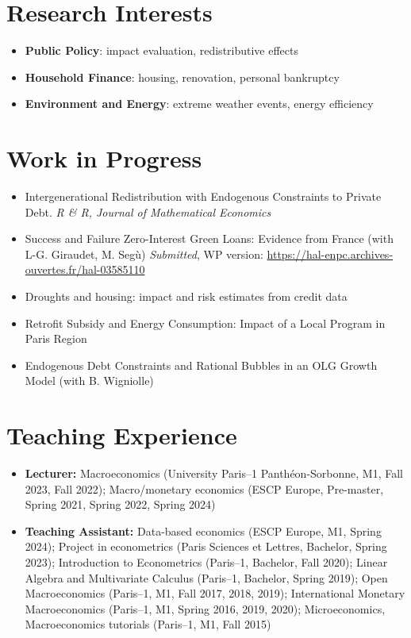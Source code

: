 \documentclass[letterpaper,11pt]{article}
\begin{document}
\section*{Research Interests}
\begin{itemize}[leftmargin=*]
    \item \textbf{Public Policy}: impact evaluation, redistributive effects
    \item \textbf{Household Finance}: housing, renovation, personal bankruptcy
    \item \textbf{Environment and Energy}: extreme weather events, energy efficiency
\end{itemize}

\section*{Work in Progress}
\begin{itemize}[leftmargin=*]
    \item Intergenerational Redistribution with Endogenous Constraints to Private Debt. \emph{R \& R, Journal of Mathematical Economics}
    \item Success and Failure Zero-Interest Green Loans: Evidence from France (with L-G. Giraudet, M. Seg\`{u}) \emph{Submitted}, WP version: \url{https://hal-enpc.archives-ouvertes.fr/hal-03585110}
    \item Droughts and housing: impact and risk estimates from credit data
    \item Retrofit Subsidy and Energy Consumption: Impact of a Local Program in Paris Region
    \item Endogenous Debt Constraints and Rational Bubbles in an OLG Growth Model (with B. Wigniolle)
\end{itemize}

\section*{Teaching Experience}
\begin{itemize}[leftmargin=*]
    \item \textbf{Lecturer:} Macroeconomics (University Paris--1 Panthéon-Sorbonne, M1, Fall 2023, Fall 2022); Macro/monetary economics (ESCP Europe, Pre-master, Spring 2021, Spring 2022, Spring 2024)
    \item \textbf{Teaching Assistant:} Data-based economics (ESCP Europe, M1, Spring 2024); Project in econometrics (Paris Sciences et Lettres, Bachelor, Spring 2023); Introduction to Econometrics (Paris--1, Bachelor, Fall 2020); Linear Algebra and Multivariate Calculus (Paris--1, Bachelor, Spring 2019); Open Macroeconomics (Paris--1, M1, Fall 2017, 2018, 2019); International Monetary Macroeconomics (Paris--1, M1, Spring 2016, 2019, 2020); Microeconomics, Macroeconomics tutorials (Paris--1, M1, Fall 2015)
\end{itemize}
\end{document}
